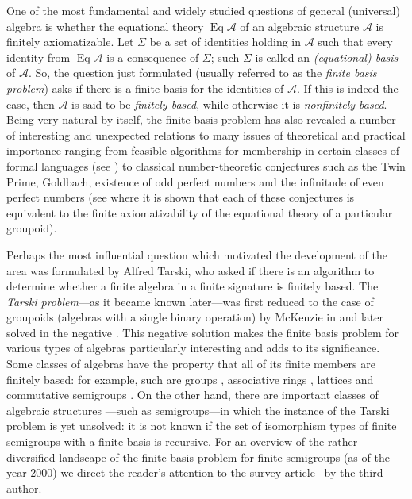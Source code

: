 \documentclass[preprint,1p,times]{elsarticle}
\DeclareMathOperator{\Id}{Eq}
\numberwithin{equation}{section}
\theoremstyle{remark}
\def\Si{\Sigma}
\begin{document}
One of the most fundamental and widely studied questions of general (universal) algebra is whether the equational
theory $\Id \mathcal{A}$ of an algebraic structure $\mathcal A$ is finitely axiomatizable. Let $\Si$ be a set of
identities holding in $\mathcal{A}$ such that every identity from $\Id \mathcal{A}$ is a consequence of $\Si$; such
$\Si$ is called an \emph{(equational) basis} of $\mathcal{A}$. So, the question just formulated (usually referred to as
the \emph{finite basis problem}) asks if there is a finite basis for the identities of $\mathcal{A}$. If this is indeed
the case, then $\mathcal{A}$ is said to be \emph{finitely based}, while otherwise it is \emph{nonfinitely based}. Being
very natural by itself, the finite basis problem has also revealed a number of interesting and unexpected relations to
many issues of theoretical and practical importance ranging from feasible algorithms for membership in certain classes
of formal languages (see \cite{Alm95}) to classical number-theoretic conjectures such as the Twin Prime, Goldbach,
existence of odd perfect numbers and the infinitude of even perfect numbers (see \cite{Per89} where it is shown that
each of these conjectures is equivalent to the finite axiomatizability of the equational theory of a particular
groupoid).

Perhaps the most influential question which motivated the development of the area was formulated by Alfred Tarski, who
asked if there is an algorithm to determine whether a finite algebra in a finite signature is finitely based. The
\emph{Tarski problem}---as it became known later---was first reduced to the case of groupoids (algebras with a single
binary operation) by McKenzie in \cite{McK2} and later solved in the negative \cite{McK3}. This negative solution makes
the finite basis problem for various types of algebras particularly interesting and adds to its significance. Some
classes of algebras have the property that all of its finite members are finitely based: for example, such are groups
\cite{OP}, associative rings \cite{Kru,Lvov}, lattices \cite{McK1} and commutative semigroups \cite{Per69}. On the
other hand, there are important classes of algebraic structures ---such as semigroups---in which the instance of the
Tarski problem is yet unsolved: it is not known if the set of isomorphism types of finite semigroups with a finite
basis is recursive. For an overview of the rather diversified landscape of the finite basis problem for finite
semigroups (as of the year 2000) we direct the reader's attention to the survey article~\cite{volkovjaponicae} by the
third author.
\end{document}
